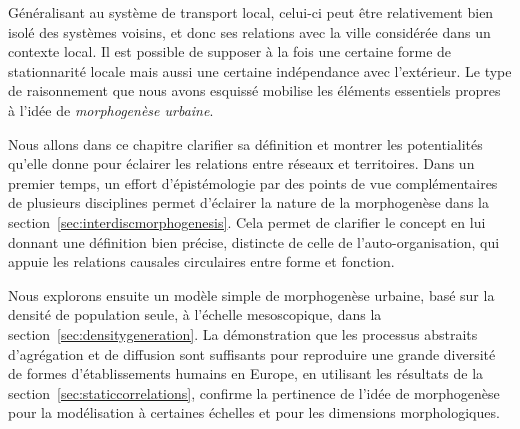Généralisant au système de transport local, celui-ci peut être relativement bien isolé des systèmes voisins, et donc ses relations avec la ville considérée dans un contexte local. Il est possible de supposer à la fois une certaine forme de stationnarité locale mais aussi une certaine indépendance avec l'extérieur. Le type de raisonnement que nous avons esquissé mobilise les éléments essentiels propres à l'idée de \emph{morphogenèse urbaine}.



Nous allons dans ce chapitre clarifier sa définition et montrer les potentialités qu'elle donne pour éclairer les relations entre réseaux et territoires. Dans un premier temps, un effort d'épistémologie par des points de vue complémentaires de plusieurs disciplines permet d'éclairer la nature de la morphogenèse dans la section~\ref{sec:interdiscmorphogenesis}. Cela permet de clarifier le concept en lui donnant une définition bien précise, distincte de celle de l'auto-organisation, qui appuie les relations causales circulaires entre forme et fonction.

Nous explorons ensuite un modèle simple de morphogenèse urbaine, basé sur la densité de population seule, à l'échelle mesoscopique, dans la section~\ref{sec:densitygeneration}. La démonstration que les processus abstraits d'agrégation et de diffusion sont suffisants pour reproduire une grande diversité de formes d'établissements humains en Europe, en utilisant les résultats de la section~\ref{sec:staticcorrelations}, confirme la pertinence de l'idée de morphogenèse pour la modélisation à certaines échelles et pour les dimensions morphologiques.

